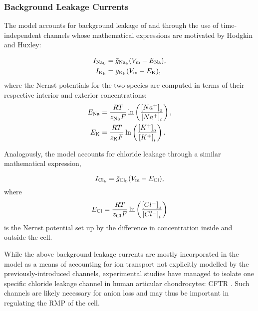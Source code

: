 \subsubsection*{Background Leakage Currents}
\label{sec:background-currents}

The model accounts for background leakage of \Na{} and \K{} through
the use of time-independent channels whose mathematical expressions
are motivated by Hodgkin and Huxley:

\begin{equation}
  \begin{split}
    I_{\rm Na_b} & = \bar{g}_{\rm Na_b} (V_{\rm m} - E_{\rm Na}),\\
    I_{\rm K_b} & = \bar{g}_{\rm K_b} (V_{\rm m} - E_{\rm K}),\\
  \end{split}
\end{equation}
where the Nernst potentials for the two species are computed in terms
of their respective interior and exterior concentrations:
\begin{equation}
  \begin{split}
    E_{\rm Na} & =  \frac{R T}{z_{\rm Na} F}
    \ln\left(\frac{\left[Na^{+}\right]_{o}}
      {\left[Na^{+}\right]_{i}}\right),\\
    E_{\rm K} & =  \frac{R T}{z_{\rm K} F}
    \ln\left(\frac{\left[K^{+}\right]_{o}}
      {\left[K^{+}\right]_{i}}\right).
  \end{split}
\end{equation}

Analogously, the model accounts for chloride leakage through a similar
mathematical expression,

\begin{equation}
  I_{\rm Cl_b} = \bar{g}_{\rm Cl_b} (V_{\rm m} - E_{\rm Cl}),
\end{equation}
where
\begin{equation}
  E_{\rm Cl} =  \frac{R T}{z_{\rm Cl} F}
  \ln\left(\frac{\left[Cl^{-}\right]_{o}}
          {\left[Cl^{-}\right]_{i}}\right)
\end{equation}
is the Nernst potential set up by the difference in \Cl{}
concentration inside and outside the cell.

While the above background leakage currents are mostly incorporated in
the model as a means of accounting for ion transport not explicitly
modelled by the previously-introduced channels, experimental studies
have managed to isolate one specific chloride leakage channel in human
articular chondrocytes: CFTR \citep{UNKNOWN}. Such channels are likely
necessary for anion loss and may thus be important in regulating the
RMP of the cell.

